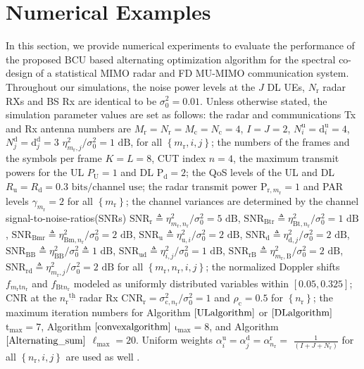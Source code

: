 \documentclass[9pt,journal]{IEEEtran}
\newcommand{\paren}[1]{\left({#1}\right)}
\newcommand{\bracket}[1]{{\left [{#1}\right ]}}
\newcommand{\braces}[1]{{\left\{ {#1}\right\}}}
\newcommand{\ith}[1]    {{#1}^{\underline{\text{th}}}}
\newcommand{\rr}{_\mathrm{r}}
\newcommand{\cc}{_\mathrm{c}}
\newcommand{\sfrac}[2]{#1/#2}
\begin{document}
\section{Numerical Examples}
\label{sec:numerical}
In this section, we provide numerical experiments to evaluate the performance of the proposed BCU based alternating optimization algorithm for the spectral co-design of a statistical MIMO radar and FD MU-MIMO communication system. Throughout our simulations, the noise power levels at the $\mathit{J}$ DL UEs, $\mathit{N}\rr$ radar RXs and BS Rx are identical to be $\sigma^2_0=0.01$. Unless otherwise stated, the simulation parameter values are set as follows: the radar and communications Tx and Rx antenna numbers are $\mathit{M}\rr=\mathit{N}\rr=\mathit{M}\cc=\mathit{N}\cc=4$, $\mathit{I}=\mathit{J}=2$, $\mathit{N}^{\textrm{u}}_i=\mathrm{d}^{\textrm{u}}_i=4$, $\mathit{N}^{\textrm{d}}_j=\mathrm{d}^{\textrm{d}}_j=3$  $\sfrac{\eta^2_{m\rr,j}}{\sigma^2_0}=1\textrm{ dB}$, for all $\braces{m\rr,i,j}$; the numbers of the frames and the symbols per frame $\mathit{K}=\mathit{L}=8$, CUT index $n=4$, the maximum transmit powers for the UL $\mathit{P}_\textrm{U}=1$ and DL $\mathrm{P}_\textrm{d}=2$; the QoS levels of the UL and DL $\mathit{R}_{\textrm{u}}=\mathit{R}_{\textrm{d}}=0.3\textrm{ bits/channel use}$; the radar transmit power $\mathrm{P}_{\textrm{r},m\rr}=1$ and PAR levels $\gamma_{m\rr}=2$ for all $\braces{m\rr}$; the channel variances are determined by the channel signal-to-noise-ratios(SNRs) $\mathrm{SNR}_{\textrm{r}}\triangleq\sfrac{\eta^2_{m\rr,n\rr}}{\sigma^2_{0}}=5\textrm{ dB}$, $\mathrm{SNR}_{\textrm{Btr}}\triangleq\sfrac{\eta^2_{\textrm{Bt},n\rr}}{\sigma^2_{0}}=1 \textrm{ dB}$, $\mathrm{SNR}_{\textrm{Bmr}}\triangleq\sfrac{\eta^2_{\textrm{Bm},n\rr}}{\sigma^2_{0}}=2 \textrm{ dB}$, $\mathrm{SNR}_{\textrm{u}}\triangleq\sfrac{\eta^2_{\textrm{u},i}}{\sigma^2_{0}}=2\textrm{ dB}$, $\mathrm{SNR}_{\textrm{d}}\triangleq\sfrac{\eta^2_{\textrm{d},j}}{\sigma^2_0}=2\textrm{ dB}$, $\mathrm{SNR}_{\textrm{BB}}\triangleq\sfrac{\eta^2_{\textrm{BB}}}{\sigma^2_{0}}\triangleq1\textrm{ dB}$, $\mathrm{SNR}_{\textrm{ud}}\triangleq\sfrac{\eta^2_{i,j}}{\sigma^2_{0}}=1\textrm{ dB}$, $\mathrm{SNR}_{\textrm{rB}}\triangleq\sfrac{\eta^2_{m\rr,\textrm{B}}}{\sigma^2_0}=2\textrm{ dB}$, $\mathrm{SNR}_{\textrm{rd}}\triangleq\sfrac{\eta^2_{m\rr,j}}{\sigma^2_0}=2\textrm{ dB}$ for all $\braces{m\rr,n\rr,i,j}$; the normalized Doppler shifts $f_{m\rr\textrm{t}n\rr}$ and $f_{\textrm{Bt}n\rr}$ modeled as uniformly distributed variables within $\bracket{0.05,0.325}$; CNR at the $\ith{n\rr}$ radar Rx $\mathrm{CNR}_{\textrm{r}}=\sfrac{\sigma^2_{\text{c},n\rr}}{\sigma^2_0}=1$ and $\rho_{\textrm{c}}=0.5$ for $\braces{n\rr}$; the maximum iteration numbers for Algorithm $\ref{ULalgorithm}$ or $\ref{DLalgorithm}$ $\mathrm{t}_{\textrm{max}}=7$, Algorithm $\ref{convexalgorithm}$ $\mathrm{\iota}_{\textrm{max}}=8$, and Algorithm $\ref{Alternating_sum}$ $\mathrm{\ell}_{\textrm{max}}=20$. Uniform weights  $\alpha^\textrm{u}_{i}= \alpha^{\textrm{d}}_{j}=\alpha^\textrm{r}_{n\rr}=$ $\frac{1}{\paren{\mathit{I}+\mathit{J}+\mathit{N}\rr}}$ for all $\braces{n\rr,i,j}$ are used as well .
\end{document}
